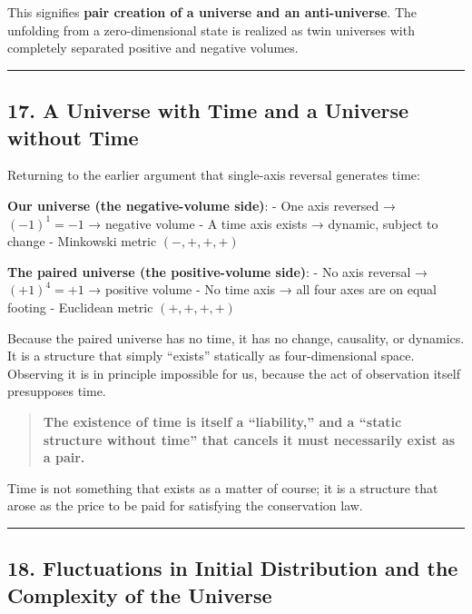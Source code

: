 \documentclass[a4paper,11pt]{article}
\theoremstyle{definition}
\begin{document}
This signifies \textbf{pair creation of a universe and an
anti-universe}. The unfolding from a zero-dimensional state is realized
as twin universes with completely separated positive and negative
volumes.

\begin{center}\rule{0.5\linewidth}{0.5pt}\end{center}

\subsection{17. A Universe with Time and a Universe without
Time}\label{a-universe-with-time-and-a-universe-without-time}

Returning to the earlier argument that single-axis reversal generates
time:

\textbf{Our universe (the negative-volume side)}: - One axis reversed →
\((-1)^1 = -1\) → negative volume - A time axis exists → dynamic,
subject to change - Minkowski metric \((-,+,+,+)\)

\textbf{The paired universe (the positive-volume side)}: - No axis
reversal → \((+1)^4 = +1\) → positive volume - No time axis → all four
axes are on equal footing - Euclidean metric \((+,+,+,+)\)

Because the paired universe has no time, it has no change, causality, or
dynamics. It is a structure that simply ``exists'' statically as
four-dimensional space. Observing it is in principle impossible for us,
because the act of observation itself presupposes time.

\begin{quote}
\textbf{The existence of time is itself a ``liability,'' and a ``static
structure without time'' that cancels it must necessarily exist as a
pair.}
\end{quote}

Time is not something that exists as a matter of course; it is a
structure that arose as the price to be paid for satisfying the
conservation law.

\begin{center}\rule{0.5\linewidth}{0.5pt}\end{center}

\subsection{18. Fluctuations in Initial Distribution and the Complexity
of the
Universe}\label{fluctuations-in-initial-distribution-and-the-complexity-of-the-universe}
\end{document}
